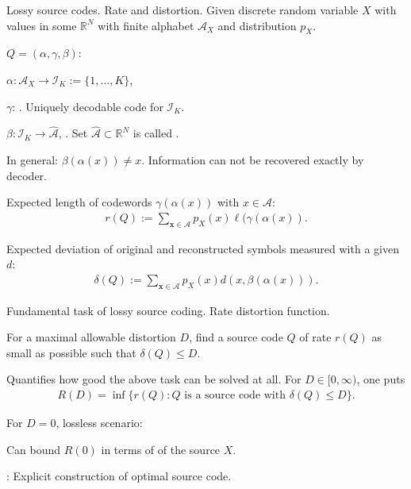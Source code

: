 \begin{frame}{Lossy source codes. Rate and distortion.}
Given discrete random variable $X$ with values in some $\mathbb{R}^N$ with finite alphabet $\mathcal{A}_X$ and distribution $p_{X}$. 

 $Q=(\alpha,\gamma,\beta)$:
\bit
\item $\alpha: \mathcal{A}_X\to \mathcal{I}_K:=\{1,\dots,K\}$, 
\item $\gamma$: . Uniquely decodable code for $\mathcal{I}_K$. 
\item $\beta: \mathcal{I}_K\to\widehat{\mathcal{A}}$, . Set $\widehat{\mathcal{A}}\subset\mathbb{R}^N$ is called . 
\item In general: $\beta(\alpha(x))\neq x$. Information can not be recovered exactly by decoder.
\eit
{}
\bit
\item {} Expected length of codewords $\gamma(\alpha(x))$ with $x\in\mathcal{A}$:  
\begin{align*}
r(Q):=\sum_{\mathbf{x}\in\mathcal{A}}p_X(x)\ell(\gamma(\alpha(x)).
\end{align*}
\item {} Expected 
 deviation of original and reconstructed symbols measured with a given  $d$:
\begin{align*}
\delta(Q):=\sum_{\mathbf{x}\in\mathcal{A}}p_X(x)d(x,\beta(\alpha(x))).
\end{align*}
\eit
\end{frame}



\begin{frame}{Fundamental task of lossy source coding. Rate distortion function.}
\bit
\item []For a maximal allowable distortion $D$, find a source code $Q$ of rate $r(Q)$ as small 
as possible such that $\delta(Q)\leq D$. 
\eit 

\bit
\item Quantifies how good the above task can be solved at all. For $D\in [0,\infty)$, one puts
\begin{align*}
R(D)= \inf\{r(Q)\colon \text{$Q$ is a source code with $\delta(Q)\leq D$}\}.
\end{align*}
\item For $D=0$, lossless scenario: 
\bit
\item Can bound $R(0)$ in terms of  of the source $X$. 
\item {}: Explicit construction of optimal source code.  
\eit 
\eit 
{} 
\end{frame}

